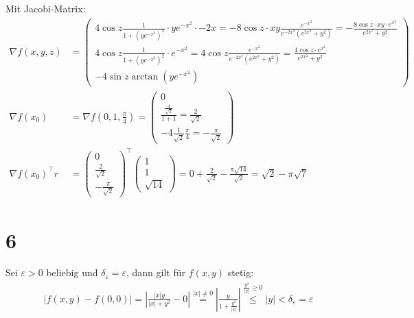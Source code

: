 \documentclass[11pt,a4paper]{article}
\newcommand{\1}    	{\mathbbm{1}}
\begin{document}
	\noindent
	Mit Jacobi-Matrix:
	\begin{align*}
		\nabla f (x,y,z) &= \left( \begin{array}{c}
			4 \cos z \frac{1}{1 + \left( ye^{-x^2} \right)^2}	\cdot y e^{-x^2} \cdot -2x = 
			-8 \cos z \cdot xy \frac{e^{-x^2}}{e^{-2x^2} \left( e^{2x^2} + y^2 \right)} = 
			- \frac{8 \cos z \cdot xy \cdot e^{x^2}}{e^{2x^2} + y^2} \\
			4 \cos z \frac{1}{1 + \left( ye^{-x^2} \right)^2} \cdot e^{-x^2} = 
			4 \cos z \frac{e^{-x^2}}{e^{-2x^2} \left( e^{2x^2} + y^2 \right)} = 
			\frac{4 \cos z \cdot e^{x^2} }{e^{2x^2} + y^2}\\
			- 4 \sin z \arctan \left( y e^{-x^2} \right)
		\end{array} \right) \\
		\nabla f\left( x_0 \right) &= 
		\nabla f\left( 0,1,\frac{\pi}{4} \right) = \left( \begin{array}{c}
			0 \\
			\frac{\frac{4}{\sqrt{2}}}{1 + 1} = \frac{2}{\sqrt{2}} \\
			-4 \frac{1}{\sqrt{2}} \frac{\pi}{4} = - \frac{\pi}{\sqrt{2}}
		\end{array} \right) \\
		\nabla f\left( x_0 \right)^\top r &= \left( \begin{array}{c}
			0 \\
			\frac{2}{\sqrt{2}} \\
			- \frac{\pi}{\sqrt{2}}
		\end{array} \right)^\top \left( \begin{array}{c}
			1 \\ 1 \\ \sqrt{14}
		\end{array} \right) = 0 + \frac{2}{\sqrt{2}} - \frac{\pi \sqrt{14}}{\sqrt{2}} = \sqrt{2} - \pi \sqrt{7}
	\end{align*}
	
	\section*{6}
	Sei \(\varepsilon > 0\) beliebig und \(\delta_\varepsilon = \varepsilon\), dann gilt für \(f(x,y)\) stetig:
	\begin{align*}
		\left\vert f(x,y) - f(0,0) \right\vert = 
		\left\vert \frac{\vert x \vert y}{\vert x \vert + y^2} - 0\right\vert \stackrel{\vert x \vert \neq 0}{=} 
		\left\vert \frac{y}{1 + \frac{y^2}{\vert x \vert}} \right\vert \stackrel{\frac{y^2}{\vert x \vert} \geqslant 0}{\leqslant}
		\vert y \vert < \delta_\varepsilon = \varepsilon
	\end{align*}
	
\end{document}
